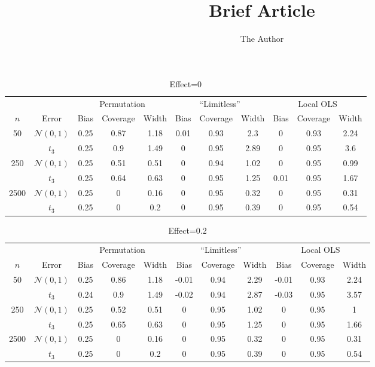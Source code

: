 \documentclass[11pt]{article} %
\title{Brief Article}
\author{The Author}
\begin{document}
\begin{table}
\footnotesize
\begin{tabular}{cc|ccc|ccc|ccc}
\hline

&& \multicolumn{ 3 }{c}{Permutation}&\multicolumn{ 3 }{c}{``Limitless''}&\multicolumn{ 3 }{c}{Local OLS}\\
$n$& Error & Bias&Coverage&Width&Bias&Coverage&Width&Bias&Coverage&Width \\
\hline 
\hline 
\multirow{2}{*}{ 50 } & $\mathcal{N}(0,1)$ &0.25&0.87&1.18&0.01&0.93&2.3&0&0.93&2.24 \\ 
 & $t_3$ &0.25&0.9&1.49&0&0.95&2.89&0&0.95&3.6 \\ 
\hline 
\multirow{2}{*}{ 250 } & $\mathcal{N}(0,1)$ &0.25&0.51&0.51&0&0.94&1.02&0&0.95&0.99 \\ 
 & $t_3$ &0.25&0.64&0.63&0&0.95&1.25&0.01&0.95&1.67 \\ 
\hline 
\multirow{2}{*}{ 2500 } & $\mathcal{N}(0,1)$ &0.25&0&0.16&0&0.95&0.32&0&0.95&0.31 \\ 
 & $t_3$ &0.25&0&0.2&0&0.95&0.39&0&0.95&0.54 \\ 
\hline
\end{tabular}
\caption{Effect=0}
\end{table}



\begin{table}
\footnotesize
\begin{tabular}{cc|ccc|ccc|ccc}
\hline

&& \multicolumn{ 3 }{c}{Permutation}&\multicolumn{ 3 }{c}{``Limitless''}&\multicolumn{ 3 }{c}{Local OLS}\\
$n$& Error & Bias&Coverage&Width&Bias&Coverage&Width&Bias&Coverage&Width \\
\hline 
\hline 
\multirow{2}{*}{ 50 } & $\mathcal{N}(0,1)$ &0.25&0.86&1.18&-0.01&0.94&2.29&-0.01&0.93&2.24 \\ 
 & $t_3$ &0.24&0.9&1.49&-0.02&0.94&2.87&-0.03&0.95&3.57 \\ 
\hline 
\multirow{2}{*}{ 250 } & $\mathcal{N}(0,1)$ &0.25&0.52&0.51&0&0.95&1.02&0&0.95&1 \\ 
 & $t_3$ &0.25&0.65&0.63&0&0.95&1.25&0&0.95&1.66 \\ 
\hline 
\multirow{2}{*}{ 2500 } & $\mathcal{N}(0,1)$ &0.25&0&0.16&0&0.95&0.32&0&0.95&0.31 \\ 
 & $t_3$ &0.25&0&0.2&0&0.95&0.39&0&0.95&0.54 \\ 
\hline
\end{tabular}
\caption{Effect=0.2}
\end{table}
\end{document}
